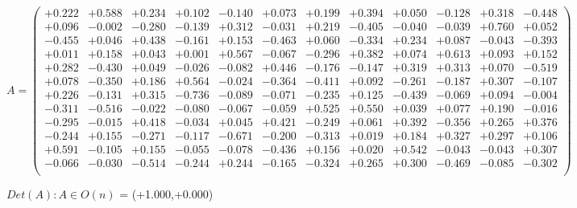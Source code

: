 \documentclass[9pt]{article}
\theoremstyle{plain}
\theoremstyle{definition}
\theoremstyle{remark}
\numberwithin{equation}{section}
\begin{document}
$A = \left(
\begin{array}{
cccccccccccc}
+0.222 & +0.588 & +0.234 & +0.102 & -0.140 & +0.073 & +0.199 & +0.394 & +0.050 & -0.128 & +0.318 & -0.448 \\
+0.096 & -0.002 & -0.280 & -0.139 & +0.312 & -0.031 & +0.219 & -0.405 & -0.040 & -0.039 & +0.760 & +0.052 \\
-0.455 & +0.046 & +0.438 & -0.161 & +0.153 & -0.463 & +0.060 & -0.334 & +0.234 & +0.087 & -0.043 & -0.393 \\
+0.011 & +0.158 & +0.043 & +0.001 & +0.567 & -0.067 & -0.296 & +0.382 & +0.074 & +0.613 & +0.093 & +0.152 \\
+0.282 & -0.430 & +0.049 & -0.026 & -0.082 & +0.446 & -0.176 & -0.147 & +0.319 & +0.313 & +0.070 & -0.519 \\
+0.078 & -0.350 & +0.186 & +0.564 & -0.024 & -0.364 & -0.411 & +0.092 & -0.261 & -0.187 & +0.307 & -0.107 \\
+0.226 & -0.131 & +0.315 & -0.736 & -0.089 & -0.071 & -0.235 & +0.125 & -0.439 & -0.069 & +0.094 & -0.004 \\
-0.311 & -0.516 & -0.022 & -0.080 & -0.067 & -0.059 & +0.525 & +0.550 & +0.039 & +0.077 & +0.190 & -0.016 \\
-0.295 & -0.015 & +0.418 & -0.034 & +0.045 & +0.421 & -0.249 & +0.061 & +0.392 & -0.356 & +0.265 & +0.376 \\
-0.244 & +0.155 & -0.271 & -0.117 & -0.671 & -0.200 & -0.313 & +0.019 & +0.184 & +0.327 & +0.297 & +0.106 \\
+0.591 & -0.105 & +0.155 & -0.055 & -0.078 & -0.436 & +0.156 & +0.020 & +0.542 & -0.043 & -0.043 & +0.307 \\
-0.066 & -0.030 & -0.514 & -0.244 & +0.244 & -0.165 & -0.324 & +0.265 & +0.300 & -0.469 & -0.085 & -0.302 \\
\end{array}
\right)$ \newline 

$Det(A) :   A \in O(n)$ = (+1.000,+0.000)
\end{document}
